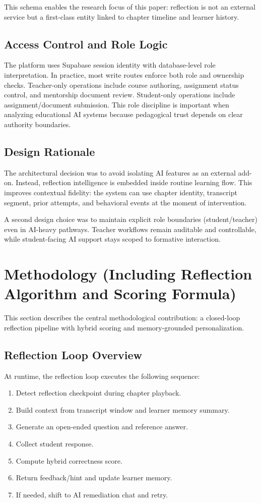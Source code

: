 \documentclass[conference]{IEEEtran}
\begin{document}
This schema enables the research focus of this paper: reflection is not an external service but a first-class entity linked to chapter timeline and learner history.

\subsection{Access Control and Role Logic}
The platform uses Supabase session identity with database-level role interpretation. In practice, most write routes enforce both role and ownership checks. Teacher-only operations include course authoring, assignment status control, and mentorship document review. Student-only operations include assignment/document submission. This role discipline is important when analyzing educational AI systems because pedagogical trust depends on clear authority boundaries.

\subsection{Design Rationale}
The architectural decision was to avoid isolating AI features as an external add-on. Instead, reflection intelligence is embedded inside routine learning flow. This improves contextual fidelity: the system can use chapter identity, transcript segment, prior attempts, and behavioral events at the moment of intervention.

A second design choice was to maintain explicit role boundaries (student/teacher) even in AI-heavy pathways. Teacher workflows remain auditable and controllable, while student-facing AI support stays scoped to formative interaction.

\section{Methodology (Including Reflection Algorithm and Scoring Formula)}
This section describes the central methodological contribution: a closed-loop reflection pipeline with hybrid scoring and memory-grounded personalization.

\subsection{Reflection Loop Overview}
At runtime, the reflection loop executes the following sequence:
\begin{enumerate}
\item Detect reflection checkpoint during chapter playback.
\item Build context from transcript window and learner memory summary.
\item Generate an open-ended question and reference answer.
\item Collect student response.
\item Compute hybrid correctness score.
\item Return feedback/hint and update learner memory.
\item If needed, shift to AI remediation chat and retry.
\end{enumerate}
\end{document}
